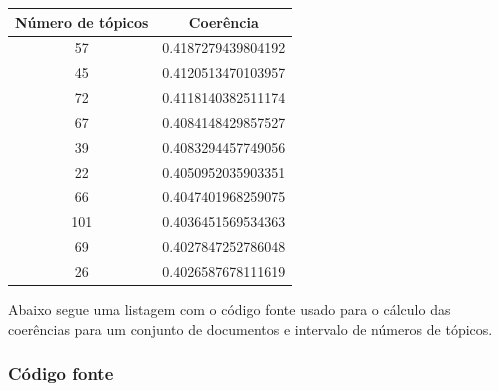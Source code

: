 \begin{center}
    \begin{tabular}{ |c|c| }
        \hline
        \textbf{Número de tópicos} & \textbf{Coerência} \\ [0.5ex]
        \hline
        57 & 0.4187279439804192 \\
        \hline
        45 & 0.4120513470103957 \\
        \hline
        72 & 0.4118140382511174 \\
        \hline
        67 & 0.4084148429857527 \\
        \hline
        39 & 0.4083294457749056 \\
        \hline
        22 & 0.4050952035903351 \\
        \hline
        66 & 0.4047401968259075 \\
        \hline
        101 & 0.4036451569534363 \\
        \hline
        69 & 0.4027847252786048 \\
        \hline
        26 & 0.4026587678111619 \\
        \hline
    \end{tabular}
\end{center}

Abaixo segue uma listagem com o código fonte usado para o cálculo das coerências para um conjunto de documentos e intervalo de números de tópicos.

\subsubsection{Código fonte}

